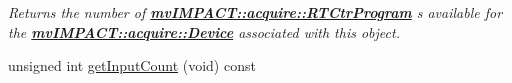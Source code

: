 \begin{DoxyCompactItemize}
\begin{DoxyCompactList}\small\item\em Returns the number of {\bfseries \hyperlink{classmv_i_m_p_a_c_t_1_1acquire_1_1_r_t_ctr_program}{mv\+I\+M\+P\+A\+C\+T\+::acquire\+::\+R\+T\+Ctr\+Program}} s available for the {\bfseries \hyperlink{classmv_i_m_p_a_c_t_1_1acquire_1_1_device}{mv\+I\+M\+P\+A\+C\+T\+::acquire\+::\+Device}} associated with this object. \end{DoxyCompactList}\item 
\hypertarget{classmv_i_m_p_a_c_t_1_1acquire_1_1_i_o_sub_system_a87dbc8674329075b91232cdec8db52f3}{unsigned int \hyperlink{classmv_i_m_p_a_c_t_1_1acquire_1_1_i_o_sub_system_a87dbc8674329075b91232cdec8db52f3}{get\+Input\+Count} (void) const }\label{classmv_i_m_p_a_c_t_1_1acquire_1_1_i_o_sub_system_a87dbc8674329075b91232cdec8db52f3}


\end{DoxyCompactItemize}
